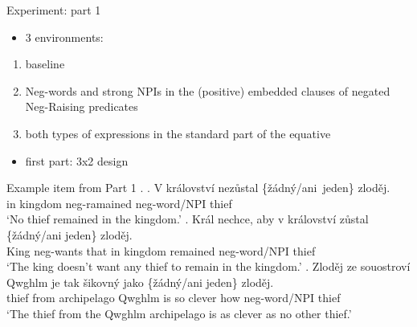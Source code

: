 \documentclass[
  ignorenonframetext,
]{beamer}
\providecommand{\tightlist}{%
  \setlength{\itemsep}{0pt}\setlength{\parskip}{0pt}}\usepackage{longtable,booktabs,array}
\begin{document}
\begin{frame}
\begin{block}{Experiment: part 1}
\protect\hypertarget{experiment-part-1}{}
\begin{itemize}
\tightlist
\item
  3 environments:
\end{itemize}

\begin{enumerate}
\item
  baseline
\item
  Neg-words and strong NPIs in the (positive) embedded clauses of
  negated Neg-Raising predicates
\item
  both types of expressions in the standard part of the equative
\end{enumerate}

\begin{itemize}
\tightlist
\item
  first part: 3x2 design
\end{itemize}
\end{block}
\end{frame}

\begin{frame}
\begin{block}{Example item from Part 1}
\protect\hypertarget{example-item-from-part-1}{}
\ex. \ag. V království nezůstal \{žádný/ani~jeden\} zloděj.\\
in kingdom neg-ramained neg-word/NPI thief\\
`No thief remained in the kingdom.' \bg. Král nechce, aby v království
zůstal \{žádný/ani jeden\} zloděj.\\
King neg-wants that in kingdom remained neg-word/NPI thief\\
`The king doesn't want any thief to remain in the kingdom.' \cg. Zloděj
ze souostroví Qwghlm je tak šikovný jako \{žádný/ani jeden\} zloděj.\\
thief from archipelago Qwghlm is so clever how neg-word/NPI thief\\
`The thief from the Qwghlm archipelago is as clever as no other thief.'

~
\end{block}
\end{frame}
\end{document}
